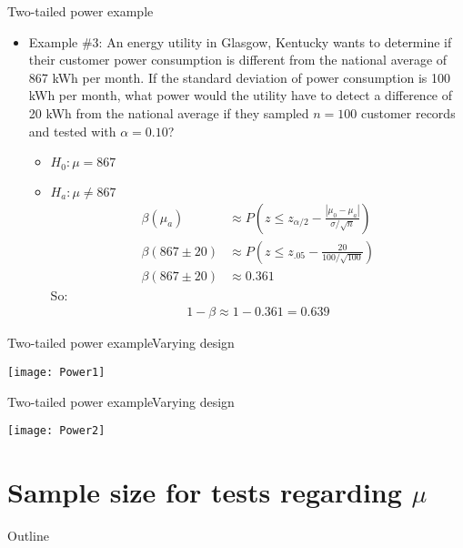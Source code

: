 \documentclass[xcolor=dvipsnames]{beamer}
\begin{document}
\begin{frame}{Two-tailed power example}
	\begin{itemize}
		\item Example \#3: An energy utility in Glasgow, Kentucky wants to determine if their customer power consumption is different from the national average of 867 kWh per month. If the standard deviation of power consumption is 100 kWh per month, what power would the utility have to detect a difference of 20 kWh from the national average if they sampled $n=100$ customer records and tested with $\alpha = 0.10$? \pause
		\begin{itemize}
			\item $H_0: \mu = 867$ \pause
			\item $H_a: \mu \neq 867$ \pause
		\begin{align*}
			\beta(\mu_a) &\approx P\left(z \leq z_{\alpha/2} - \frac{|\mu_0 - \mu_a|}{\sigma / \sqrt{n}} \right)\\
			\beta(867 \pm 20) &\approx P\left(z \leq z_{.05} - \frac{20}{100 / \sqrt{100}} \right) \\
			\beta(867 \pm 20) &\approx 0.361
		\end{align*} \pause
		So:
		\begin{align*}
			1-\beta \approx 1-0.361 =0.639
		\end{align*}
		\end{itemize}
	\end{itemize}
\end{frame}

\begin{frame}{Two-tailed power example}{Varying design}
	\begin{center}
		\texttt{[image: Power1]}
	\end{center}
\end{frame}

\begin{frame}{Two-tailed power example}{Varying design}
	\begin{center}
		\texttt{[image: Power2]}
	\end{center}
\end{frame}

\section{Sample size for tests regarding $\mu$}
\begin{frame}{Outline}
	\tableofcontents[currentsection,subsectionstyle=show/shaded/hide]
\end{frame}
\end{document}
